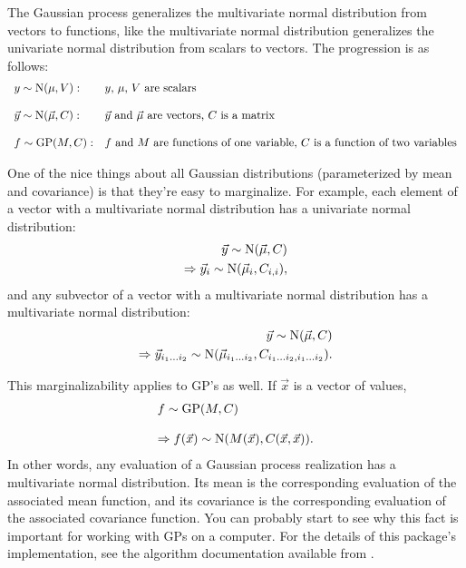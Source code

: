 \documentclass[]{manual}
\begin{document}
The Gaussian process generalizes the multivariate normal distribution from vectors to functions, like the multivariate normal distribution generalizes the univariate normal distribution from scalars to vectors. The progression is as follows:
\begin{equation}
    \begin{array}{ll}
        y\sim\textup N(\mu,V): & \textup{$y$, $\mu$, $V$ are scalars}\\\\
        \vec y\sim\textup N(\vec \mu,C): & \textup{$\vec y$ and $\vec \mu$ are vectors, $C$ is a matrix}\\\\
        f\sim\textup{GP}(M, C): & \textup{$f$ and $M$ are functions of one variable, $C$ is a function of two variables}
    \end{array}
\end{equation}

One of the nice things about all Gaussian distributions (parameterized by mean and covariance) is that they're easy to marginalize. For example, each element of a vector with a multivariate normal distribution has a univariate normal distribution:
\begin{eqnarray*}
    \vec y\sim\textup N(\vec \mu,C)\\
    \Rightarrow \vec y_i\sim\textup N(\vec \mu_i,C_{i,i}),
\end{eqnarray*}
and any subvector of a vector with a multivariate normal distribution has a multivariate normal distribution:
\begin{eqnarray*}
    \vec y\sim\textup N(\vec \mu,C)\\
    \Rightarrow \vec y_{i_1\ldots i_2}\sim\textup N(\vec \mu_{i_1\ldots i_2},C_{i_1\ldots i_2,i_1\ldots i_2}).
\end{eqnarray*}

This marginalizability applies to GP's as well. If $\vec x$ is a vector of values,
\begin{equation}
    \begin{array}{l}
        f\sim\textup{GP}(M, C)\\\\
        \Rightarrow f(\vec x) \sim\textup N(M(\vec x), C(\vec x,\vec x)).
    \end{array}
\end{equation}
In other words, any evaluation of a Gaussian process realization has a multivariate normal distribution. Its mean is the corresponding evaluation of the associated mean function, and its covariance is the corresponding evaluation of the associated covariance function. You can probably start to see why this fact is important for working with GPs on a computer. For the details of this package's implementation, see the algorithm documentation available from .
\end{document}

